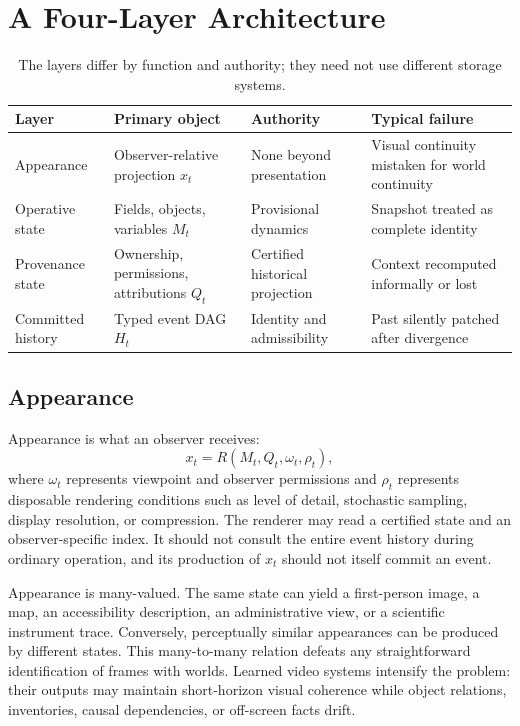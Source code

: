 \documentclass[11pt]{article}
\begin{document}
\section{A Four-Layer Architecture}
\label{sec:architecture}

\begin{table}[h]
\centering
\begin{tabular}{p{2.3cm}p{3.0cm}p{3.0cm}p{4.5cm}}
\toprule
\textbf{Layer} & \textbf{Primary object} & \textbf{Authority} & \textbf{Typical failure} \\
\midrule
Appearance & Observer-relative projection $x_t$ & None beyond presentation & Visual continuity mistaken for world continuity \\
Operative state & Fields, objects, variables $M_t$ & Provisional dynamics & Snapshot treated as complete identity \\
Provenance state & Ownership, permissions, attributions $Q_t$ & Certified historical projection & Context recomputed informally or lost \\
Committed history & Typed event DAG $H_t$ & Identity and admissibility & Past silently patched after divergence \\
\bottomrule
\end{tabular}
\caption{The layers differ by function and authority; they need not use different storage systems.}
\label{tab:layers}
\end{table}

\subsection{Appearance}
\label{sec:appearance}

Appearance is what an observer receives:
\[
x_t = R(M_t, Q_t, \omega_t, \rho_t),
\]
where $\omega_t$ represents viewpoint and observer permissions and $\rho_t$ represents disposable rendering conditions such as level of detail, stochastic sampling, display resolution, or compression. The renderer may read a certified state and an observer-specific index. It should not consult the entire event history during ordinary operation, and its production of $x_t$ should not itself commit an event.

Appearance is many-valued. The same state can yield a first-person image, a map, an accessibility description, an administrative view, or a scientific instrument trace. Conversely, perceptually similar appearances can be produced by different states. This many-to-many relation defeats any straightforward identification of frames with worlds. Learned video systems intensify the problem: their outputs may maintain short-horizon visual coherence while object relations, inventories, causal dependencies, or off-screen facts drift.
\end{document}
